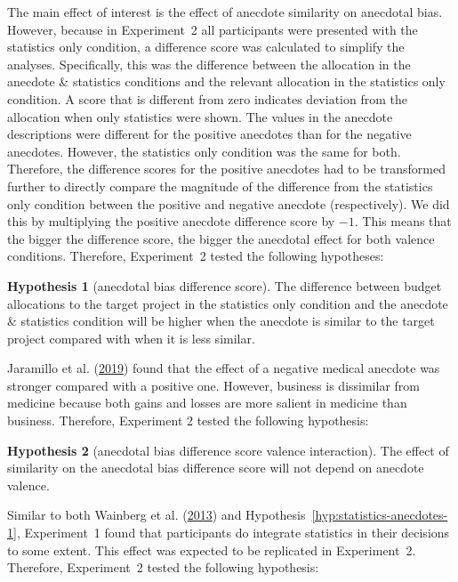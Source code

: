 \documentclass[
  man, donotrepeattitle,floatsintext]{apa7}
\theoremstyle{definition}
\theoremstyle{definition}
\theoremstyle{definition}
\theoremstyle{definition}
\newtheorem{hypothesis}{Hypothesis}
\theoremstyle{remark}
\begin{document}
The main effect of interest is the effect of anecdote similarity on anecdotal
bias. However, because in Experiment~2 all participants were presented with the
statistics only condition, a difference score was calculated to simplify the
analyses. Specifically, this was the difference between the allocation in the
anecdote \& statistics conditions and the relevant allocation in the statistics
only condition. A score that is different from zero indicates deviation from the
allocation when only statistics were shown. The values in the anecdote
descriptions were different for the positive anecdotes than for the negative
anecdotes. However, the statistics only condition was the same for both.
Therefore, the difference scores for the positive anecdotes had to be
transformed further to directly compare the magnitude of the difference from the
statistics only condition between the positive and negative anecdote
(respectively). We did this by multiplying the positive anecdote difference
score by \(-1\). This means that the bigger the difference score, the bigger the
anecdotal effect for both valence conditions. Therefore, Experiment~2 tested the
following hypotheses:

\begin{hypothesis}[anecdotal bias difference score]
\protect\hypertarget{hyp:anecdote-similarity-2}{}\label{hyp:anecdote-similarity-2}The difference between budget allocations to the target project in the
statistics only condition and the anecdote \& statistics condition will be higher
when the anecdote is similar to the target project compared with when it is
less similar.
\end{hypothesis}

Jaramillo et al. (\protect\hyperlink{ref-jaramillo2019}{2019}) found that the effect of a negative medical anecdote was stronger
compared with a positive one. However, business is dissimilar from medicine
because both gains and losses are more salient in medicine than business.
Therefore, Experiment 2 tested the following hypothesis:

\begin{hypothesis}[anecdotal bias difference score valence interaction]
\protect\hypertarget{hyp:anecdote-similarity-valence-interaction-2}{}\label{hyp:anecdote-similarity-valence-interaction-2}The effect of similarity on the anecdotal bias difference score will not depend
on anecdote valence.
\end{hypothesis}

Similar to both Wainberg et al. (\protect\hyperlink{ref-wainberg2013}{2013}) and Hypothesis~\ref{hyp:statistics-anecdotes-1},
Experiment~1 found that participants do integrate statistics in their decisions
to some extent. This effect was expected to be replicated in Experiment~2.
Therefore, Experiment~2 tested the following hypothesis:
\end{document}
